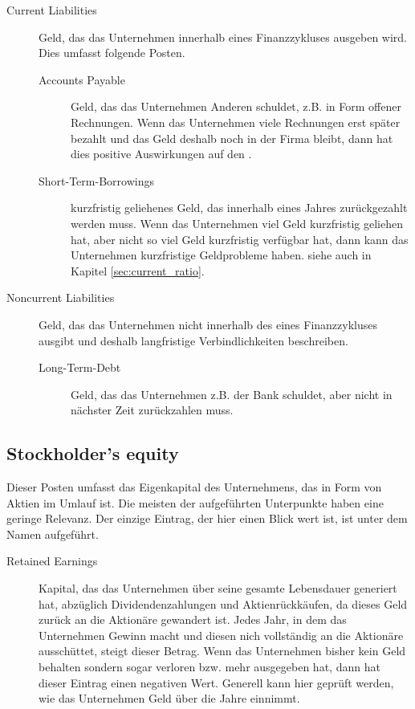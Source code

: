 \begin{description}
    \item[Current Liabilities] Geld, das das Unternehmen innerhalb eines Finanzzykluses ausgeben wird. 
        Dies umfasst folgende Posten.
        \begin{description}
            \item[Accounts Payable] Geld, das das Unternehmen Anderen schuldet, z.B. in Form offener Rechnungen. 
                Wenn das Unternehmen viele Rechnungen erst später bezahlt und das Geld deshalb noch in der Firma bleibt, dann hat dies positive Auswirkungen auf den . 
            \item[Short-Term-Borrowings] kurzfristig geliehenes Geld, das innerhalb eines Jahres zurückgezahlt werden muss. 
                Wenn das Unternehmen viel Geld kurzfristig geliehen hat, aber nicht so viel Geld kurzfristig verfügbar hat, dann kann das Unternehmen kurzfristige Geldprobleme haben.
                siehe auch  in Kapitel \ref{sec:current_ratio}.
        \end{description}
    \item[Noncurrent Liabilities] Geld, das das Unternehmen nicht innerhalb des eines Finanzzykluses ausgibt und deshalb langfristige Verbindlichkeiten beschreiben.
        \begin{description}
            \item[Long-Term-Debt] Geld, das das Unternehmen z.B. der Bank schuldet, aber nicht in nächster Zeit zurückzahlen muss. 
        \end{description}
\end{description}

%
\subsection{Stockholder's equity}

Dieser Posten umfasst das Eigenkapital des Unternehmens, das in Form von Aktien im Umlauf ist.
Die meisten der aufgeführten Unterpunkte haben eine geringe Relevanz.
Der einzige Eintrag, der hier einen Blick wert ist, ist unter dem Namen  aufgeführt.
\begin{description}
    \item[Retained Earnings] Kapital, das das Unternehmen über seine gesamte Lebensdauer generiert hat, abzüglich Dividendenzahlungen und Aktienrückkäufen, da dieses Geld zurück an die Aktionäre gewandert ist.
        Jedes Jahr, in dem das Unternehmen Gewinn macht und diesen nich vollständig an die Aktionäre ausschüttet, steigt dieser Betrag.
        Wenn das Unternehmen bisher kein Geld behalten sondern sogar verloren bzw. mehr ausgegeben hat, dann hat dieser Eintrag einen negativen Wert.
        Generell kann hier geprüft werden, wie das Unternehmen Geld über die Jahre einnimmt.
\end{description}

